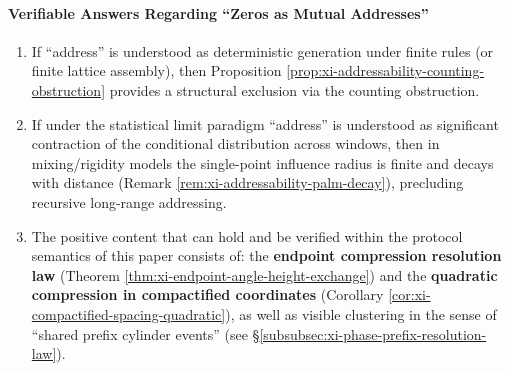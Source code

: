 \paragraph{Verifiable Answers Regarding ``Zeros as Mutual Addresses''}
\begin{enumerate}
  \item If ``address'' is understood as deterministic generation under finite rules (or finite lattice assembly), then Proposition \ref{prop:xi-addressability-counting-obstruction} provides a structural exclusion via the counting obstruction.
  \item If under the statistical limit paradigm ``address'' is understood as significant contraction of the conditional distribution across windows, then in mixing/rigidity models the single-point influence radius is finite and decays with distance (Remark \ref{rem:xi-addressability-palm-decay}), precluding recursive long-range addressing.
  \item The positive content that can hold and be verified within the protocol semantics of this paper consists of: the \textbf{endpoint compression resolution law} (Theorem \ref{thm:xi-endpoint-angle-height-exchange}) and the \textbf{quadratic compression in compactified coordinates} (Corollary \ref{cor:xi-compactified-spacing-quadratic}), as well as visible clustering in the sense of ``shared prefix cylinder events'' (see \S\ref{subsubsec:xi-phase-prefix-resolution-law}).
\end{enumerate}

\endinput
